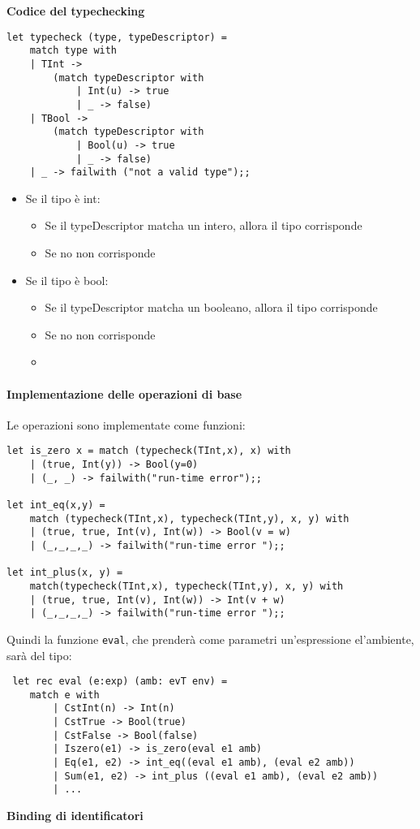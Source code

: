 \documentclass[a4paper,10pt]{article}
\begin{document}
\textbf{Codice del typechecking}
\begin{multicols}{2}

\begin{lstlisting}
let typecheck (type, typeDescriptor) =
    match type with
    | TInt ->
        (match typeDescriptor with
            | Int(u) -> true
            | _ -> false)
    | TBool ->
        (match typeDescriptor with
            | Bool(u) -> true
            | _ -> false)
    | _ -> failwith ("not a valid type");;

\end{lstlisting}
\begin{itemize}
 \item Se il tipo è int:
 \begin{itemize}
  \item Se il typeDescriptor matcha un intero, allora il tipo corrisponde
  \item Se no non corrisponde
 \end{itemize}
 \item Se il tipo è bool:
 \begin{itemize}
  \item Se il typeDescriptor matcha un booleano, allora il tipo corrisponde
  \item Se no non corrisponde
  \item[]
 \end{itemize}
\end{itemize}

\end{multicols}
\paragraph{Implementazione delle operazioni di base} Le operazioni sono implementate come funzioni:
\begin{lstlisting}
let is_zero x = match (typecheck(TInt,x), x) with
    | (true, Int(y)) -> Bool(y=0)
    | (_, _) -> failwith("run-time error");;
    
let int_eq(x,y) =
    match (typecheck(TInt,x), typecheck(TInt,y), x, y) with
    | (true, true, Int(v), Int(w)) -> Bool(v = w)
    | (_,_,_,_) -> failwith("run-time error ");;
    
let int_plus(x, y) =
    match(typecheck(TInt,x), typecheck(TInt,y), x, y) with
    | (true, true, Int(v), Int(w)) -> Int(v + w)
    | (_,_,_,_) -> failwith("run-time error ");;
\end{lstlisting}

Quindi la funzione \texttt{eval}, che prenderà come parametri un'espressione el'ambiente, sarà del tipo:
\begin{lstlisting}
 let rec eval (e:exp) (amb: evT env) =
    match e with
        | CstInt(n) -> Int(n)
        | CstTrue -> Bool(true)
        | CstFalse -> Bool(false)
        | Iszero(e1) -> is_zero(eval e1 amb)
        | Eq(e1, e2) -> int_eq((eval e1 amb), (eval e2 amb))
        | Sum(e1, e2) -> int_plus ((eval e1 amb), (eval e2 amb))
        | ...
\end{lstlisting}\smallskip
\textbf{Binding di identificatori}
\end{document}
